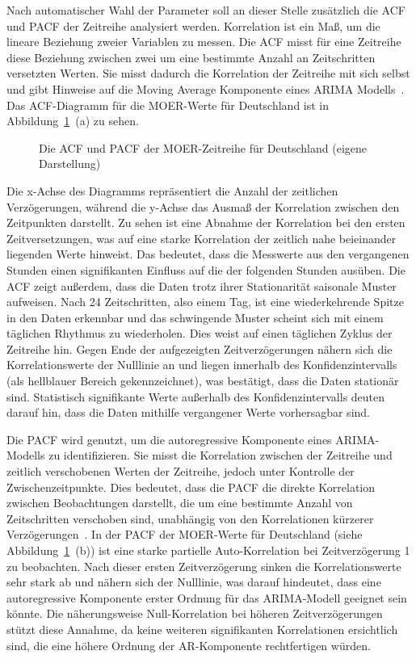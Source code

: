 Nach automatischer Wahl der Parameter soll an dieser Stelle zusätzlich die \ac{ACF} und \ac{PACF} der Zeitreihe analysiert werden.
Korrelation ist ein Maß, um die lineare Beziehung zweier Variablen zu messen.
Die \ac{ACF} misst für eine Zeitreihe diese Beziehung zwischen zwei um eine bestimmte Anzahl an Zeitschritten versetzten Werten.
Sie misst dadurch die Korrelation der Zeitreihe mit sich selbst und gibt Hinweise auf die Moving Average Komponente eines ARIMA Modells~\cite{Peixeiro.2022}.
Das \ac{ACF}-Diagramm für die \ac{MOER}-Werte für Deutschland ist in Abbildung~\ref{FIG:acf_pacf_moer_de}~(a) zu sehen.
\begin{figure}
 \centering
 \qquad
 \caption{Die ACF und PACF der MOER-Zeitreihe für Deutschland (eigene Darstellung)}%
 \label{FIG:acf_pacf_moer_de}%
\end{figure}
Die x-Achse des Diagramms repräsentiert die Anzahl der zeitlichen Verzögerungen, während die y-Achse das Ausmaß der Korrelation zwischen den Zeitpunkten darstellt.
Zu sehen ist eine Abnahme der Korrelation bei den ersten Zeitversetzungen, was auf eine starke Korrelation der zeitlich nahe beieinander liegenden Werte hinweist.
Das bedeutet, dass die Messwerte aus den vergangenen Stunden einen signifikanten Einfluss auf die der folgenden Stunden ausüben.
Die \ac{ACF} zeigt außerdem, dass die Daten trotz ihrer Stationarität saisonale Muster aufweisen.
Nach 24 Zeitschritten, also einem Tag, ist eine wiederkehrende Spitze in den Daten erkennbar und das schwingende Muster scheint sich mit einem täglichen Rhythmus zu wiederholen.
Dies weist auf einen täglichen Zyklus der Zeitreihe hin.
Gegen Ende der aufgezeigten Zeitverzögerungen nähern sich die Korrelationswerte der Nulllinie an und liegen innerhalb des Konfidenzintervalls (als hellblauer Bereich gekennzeichnet), was bestätigt, dass die Daten stationär sind.
Statistisch signifikante Werte außerhalb des Konfidenzintervalls deuten darauf hin, dass die Daten mithilfe vergangener Werte vorhersagbar sind.

Die \ac{PACF} wird genutzt, um die autoregressive Komponente eines ARIMA-Modells zu identifizieren.
Sie misst die Korrelation zwischen der Zeitreihe und zeitlich verschobenen Werten der Zeitreihe, jedoch unter Kontrolle der Zwischenzeitpunkte.
Dies bedeutet, dass die \ac{PACF} die direkte Korrelation zwischen Beobachtungen darstellt, die um eine bestimmte Anzahl von Zeitschritten verschoben sind, unabhängig von den Korrelationen kürzerer Verzögerungen~\cite{Peixeiro.2022}.
In der \ac{PACF} der \ac{MOER}-Werte für Deutschland (siehe Abbildung~\ref{FIG:acf_pacf_moer_de}~(b)) ist eine starke partielle Auto-Korrelation bei Zeitverzögerung 1 zu beobachten.
Nach dieser ersten Zeitverzögerung sinken die Korrelationswerte sehr stark ab und nähern sich der Nulllinie, was darauf hindeutet, dass eine autoregressive Komponente erster Ordnung für das ARIMA-Modell geeignet sein könnte.
Die näherungsweise Null-Korrelation bei höheren Zeitverzögerungen stützt diese Annahme, da keine weiteren signifikanten Korrelationen ersichtlich sind, die eine höhere Ordnung der AR-Komponente rechtfertigen würden.

